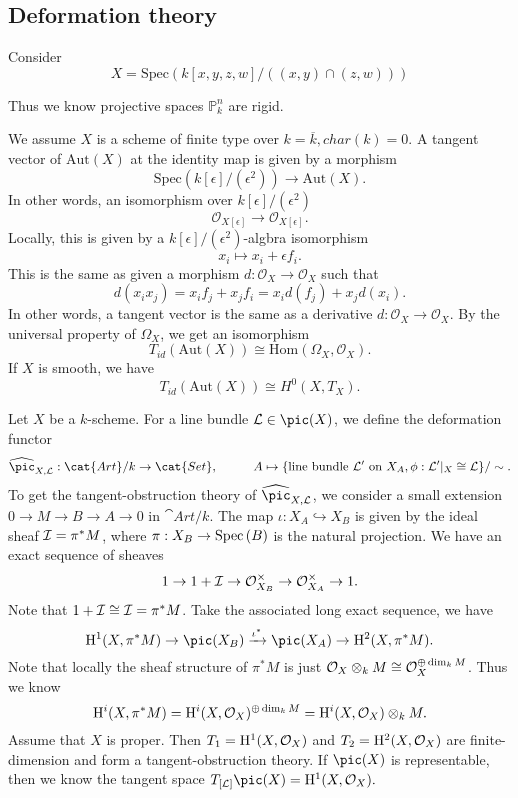 \documentclass[../main.tex]{subfiles}
\begin{document}
\subsection{Deformation theory}
\begin{example}
Consider $$X=\mathrm{Spec}(k[x,y,z,w]/((x,y)\cap(z,w)))$$
\end{example}

\begin{remark}
Thus we know projective spaces $\mathbb{P}_{k}^{n}$ are rigid. 
\end{remark}
\begin{example}
We assume $X$ is a scheme of finite type over $k=\overline{k}, char(k)=0$. A tangent vector of $\mathrm{Aut}(X)$ at the identity map is given by a morphism $$\mathrm{Spec}(k[\epsilon]/(\epsilon^{2}))\rightarrow \mathrm{Aut}(X).$$
In other words, an isomorphism over $k[\epsilon]/(\epsilon^{2})$
$$\mathcal{O}_{X[\epsilon]}\rightarrow \mathcal{O}_{X[\epsilon]}.$$
Locally, this is given by a $k[\epsilon]/(\epsilon^{2})$-algbra isomorphism
$$x_{i}\mapsto x_{i}+\epsilon f_{i}.$$
This is the same as given a morphism $d: \mathcal{O}_{X}\rightarrow \mathcal{O}_{X}$ such that 
$$d(x_{i}x_{j})=x_{i}f_{j}+x_{j}f_{i}=x_{i}d(f_{j})+x_{j}d(x_{i}).$$
In other words, a tangent vector is the same as a derivative $d: \mathcal{O}_{X}\rightarrow \mathcal{O}_{X}$. By the universal property of $\Omega_{X}$, we get an isomorphism 
$$T_{id}(\mathrm{Aut}(X))\cong \mathrm{Hom}(\Omega_{X}, \mathcal{O}_{X}).$$
If $X$ is smooth, we have 
$$T_{id}(\mathrm{Aut}(X))\cong H^{0}(X, T_{X}).$$

\end{example}

Let $X$ be a $k$-scheme. For a line bundle $\L\in \pic(X)$, we define the deformation functor 
$$\widehat{\pic}_{X, \L}:\cat{Art}/k\rightarrow \cat{Set}, \hspace{1cm} A\mapsto \{\text{line bundle } \L' \text{ on } X_{A}, \phi: \L'|_{X}\cong \L \}/\sim.$$
To get the tangent-obstruction theory of $\widehat{\pic}_{X, \L}$, we consider a small extension $0\rightarrow M\rightarrow B\rightarrow A\rightarrow 0$ in $\cat{Art}/k$. The map $\iota: X_{A}\hookrightarrow X_{B}$ is given by the ideal sheaf $\mathcal{I}=\pi^{*}M$, where $\pi: X_{B}\rightarrow \operatorname{Spec\,}(B)$ is the natural projection. We have an exact sequence of sheaves
$$1\rightarrow 1+\mathcal{I}\rightarrow \mathcal{O}^{\times}_{X_{B}}\rightarrow \mathcal{O}^{\times}_{X_{A}}\rightarrow 1.$$
Note that $1+\mathcal{I}\cong \mathcal{I}=\pi^{*}M$. Take the associated long exact sequence, we have 
$$\H^{1}(X, \pi^{*}M)\rightarrow \pic(X_{B})\xrightarrow{\iota^{*}}\pic(X_{A})\rightarrow \H^{2}(X, \pi^{*}M).$$ Note that locally the sheaf structure of $\pi^{*}M$ is just $\mathcal{O}_{X}\otimes_{k} M\cong \mathcal{O}_{X}^{\oplus \dim_{k}M}$. Thus we know
$$\mathrm{H}^{i}(X, \pi^{*}M)=\mathrm{H}^{i}(X, \mathcal{O}_{X})^{\oplus \dim_{k}M}=\mathrm{H}^{i}(X, \mathcal{O}_{X})\otimes_{k} M.$$
Assume that $X$ is proper. Then $T_{1}=\mathrm{H}^{1}(X, \mathcal{O}_{X})$ and $T_{2}=\mathrm{H}^{2}(X, \mathcal{O}_{X})$ are finite-dimension and form a tangent-obstruction theory. If $\pic(X)$ is representable, then we know the tangent space $T_{[\L]}\pic(X)=\H^{1}(X, \O_{X}).$
\end{document}
